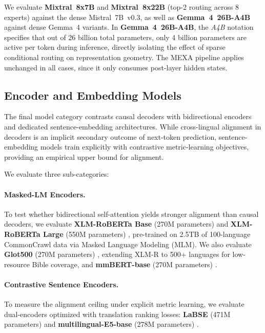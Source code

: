 We evaluate \textbf{Mixtral~8x7B} and \textbf{Mixtral~8x22B} \citep{jiang2024mixtral} (top-2 routing across 8 experts) against the dense Mistral~7B~v0.3, as well as \textbf{Gemma~4~26B-A4B} \citep{gemmateam2026gemma4technicalreport} against dense Gemma~4 variants. In \textbf{Gemma~4~26B-A4B}, the \textit{A4B} notation specifies that out of 26 billion total parameters, only 4 billion parameters are active per token during inference, directly isolating the effect of sparse conditional routing on representation geometry. The MEXA pipeline applies unchanged in all cases, since it only consumes post-layer hidden states.

\subsection{Encoder and Embedding Models}
\label{subsec:encoder-models}

The final model category contrasts causal decoders with bidirectional encoders and dedicated sentence-embedding architectures. While cross-lingual alignment in decoders is an implicit secondary outcome of next-token prediction, sentence-embedding models train explicitly with contrastive metric-learning objectives, providing an empirical upper bound for alignment.

We evaluate three sub-categories:

\paragraph{Masked-LM Encoders.}
To test whether bidirectional self-attention yields stronger alignment than causal decoders, we evaluate \textbf{XLM-RoBERTa Base} (270M parameters) and \textbf{XLM-RoBERTa Large} (550M parameters) \citep{conneau2020xlmr}, pre-trained on 2.5TB of 100-language CommonCrawl data via Masked Language Modeling (MLM). We also evaluate \textbf{Glot500} (270M parameters) \citep{imani2023glot500}, extending XLM-R to 500+ languages for low-resource Bible coverage, and \textbf{mmBERT-base} (270M parameters) \citep{mmbert2025}.

\paragraph{Contrastive Sentence Encoders.}
To measure the alignment ceiling under explicit metric learning, we evaluate dual-encoders optimized with translation ranking losses: \textbf{LaBSE} (471M parameters) \citep{feng2022labse} and \textbf{multilingual-E5-base} (278M parameters) \citep{wang2024multilingual}.

